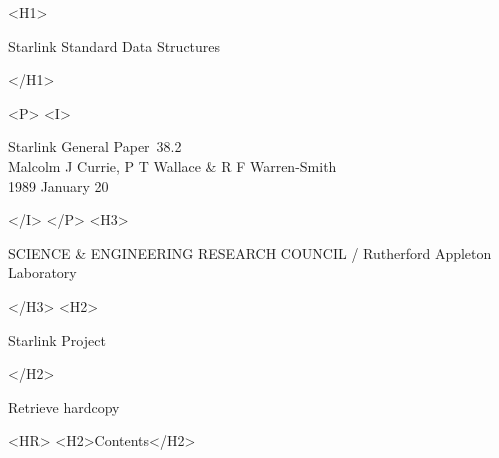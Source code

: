 \documentclass[twoside,11pt]{article}
\newcommand{\stardoccategory}  {Starlink General Paper}
\newcommand{\stardocnumber}    {38.2}
\newcommand{\stardocsource}    {sgp\stardocnumber}
\newcommand{\stardocauthors}   {Malcolm J Currie, P T Wallace \&
                                R F Warren-Smith}
\newcommand{\stardocdate}      {1989 January 20}
\newcommand{\stardoctitle}     {Starlink Standard Data Structures}
\newcommand{\htmladdnormallink}[2]{#1}
\newcommand{\htmladdimg}[1]{}
\newcommand{\htmlref}[2]{#1}
\newcommand{\htmladdtonavigation}[1]{}
\newcommand{\xlabel}[1]{}
\begin{document}
\begin{htmlonly}
   \xlabel{}
   \begin{rawhtml} <H1> \end{rawhtml}
      \stardoctitle
   \begin{rawhtml} </H1> \end{rawhtml}


   \begin{rawhtml} <P> <I> \end{rawhtml}
   \stardoccategory\ \stardocnumber \\
   \stardocauthors \\
   \stardocdate
   \begin{rawhtml} </I> </P> <H3> \end{rawhtml}
      SCIENCE \& ENGINEERING RESEARCH COUNCIL /
      \htmladdnormallink{Rutherford Appleton Laboratory}
                        {http://www.cclrc.ac.uk/ral} \\
   \begin{rawhtml} </H3> <H2> \end{rawhtml}
      \htmladdnormallink{Starlink Project}{http://star-www.rl.ac.uk/}
   \begin{rawhtml} </H2> \end{rawhtml}
   \htmladdnormallink{\htmladdimg{source.gif} Retrieve hardcopy}
      {http://star-www.rl.ac.uk/cgi-bin/hcserver?\stardocsource}\\

  \label{stardoccontents}
  \begin{rawhtml} 
    <HR>
    <H2>Contents</H2>
  \end{rawhtml}
  \htmladdtonavigation{\htmlref{\htmladdimg{contents_motif.gif}}
        {stardoccontents}}


\end{htmlonly}
\end{document}
